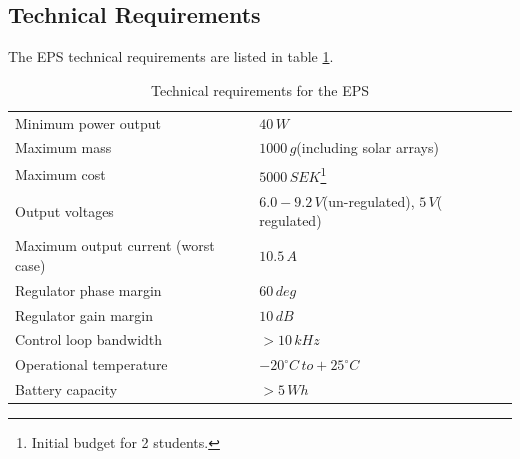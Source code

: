 \subsection{Technical Requirements}
%
The \ac{EPS} technical requirements are listed in table \ref{tab:technical_requirements}.
%
\begin{table}[H]
\centering
\caption{Technical requirements for the \ac{EPS}}
\label{tab:technical_requirements}
\begin{minipage}{\textwidth}
\begin{tabular}{p{}p{}}
\hline
Minimum power output & $40\,W$\\
Maximum mass & $1000\,g$(including solar arrays)\\
Maximum cost & $5000\,SEK$\footnote{Initial budget for 2 students.}\\
Output voltages & $6.0-9.2\,V$(un-regulated), $5\,V$( regulated)\\
Maximum output current (worst case) & $10.5\,A$\\
Regulator phase margin & $60\,deg$\\
Regulator gain margin & $10\,dB$\\
Control loop bandwidth & $>10\,kHz$\\
Operational temperature & $-20^{\circ}C\,to +25^{\circ}C$\\
Battery capacity & $>5\,Wh$\\
\hline
\end{tabular}\par
\vspace{-0.75\skip\footins}
\renewcommand{\footnoterule}{}
\end{minipage}
\end{table}
%
%
%
%
